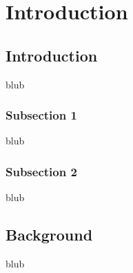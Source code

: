 
\chapter{Introduction} %

\label{ChapterIntroduction} %


\section{Introduction}

blub


\subsection{Subsection 1}

blub



\subsection{Subsection 2}

blub



\section{Background}

blub



